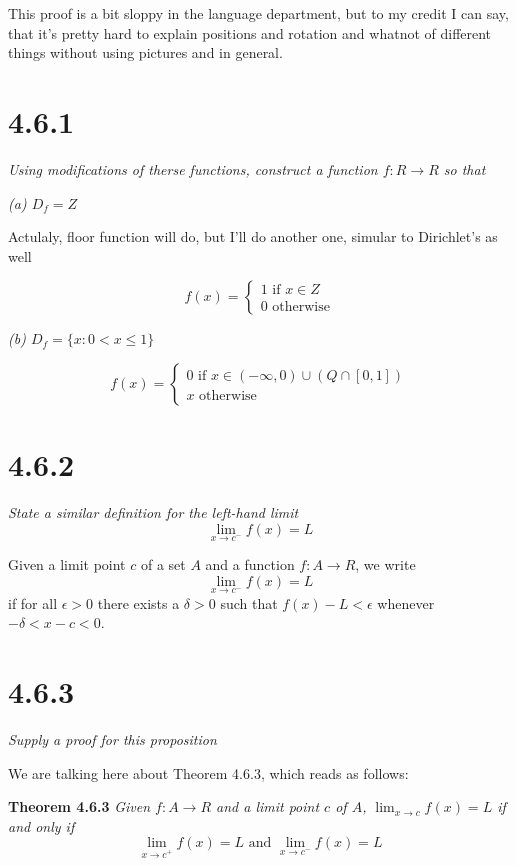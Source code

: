 \documentclass[11pt,oneside,titlepage]{book}
\begin{document}
This proof is a bit sloppy in the language department, but to my credit
I can say, that it's pretty hard to explain positions and rotation and whatnot
of different things without using pictures and in general.


\section*{4.6.1}
\textit{Using modifications of therse functions, construct a function
  $f: R \to R$ so that }

\textit{(a) $D_f = Z$}

Actulaly, floor function will do, but I'll do another one, simular to
Dirichlet's as well

\begin{equation}
  f(x) =
  \begin{cases}
    1 \text{ if } x \in Z \\
    0 \text{ otherwise}
  \end{cases}
\end{equation}

\textit{(b) $D_f = \{x: 0 < x \leq 1\}$}

\begin{equation}
  f(x) =
  \begin{cases}
    0 \text{ if } x \in (-\infty, 0) \cup (Q \cap [0, 1]) \\
    x \text { otherwise}
  \end{cases}
\end{equation}

\section*{4.6.2}
\textit{State a similar definition for the left-hand limit}
$$ \lim_{x \to c^-}{f(x)} = L$$

Given a limit point $c$ of a set $A$ and a function $f: A \to R$, we
write
$$ \lim_{x \to c^-}{f(x)} = L$$
if for all $\epsilon > 0$ there exists a $\delta > 0$ such that
$f(x) - L < \epsilon$ whenever $- \delta   < x - c < 0$.

\section*{4.6.3}
\textit{Supply a proof for this proposition}

We are talking here about Theorem 4.6.3, which reads as follows:

\textbf{Theorem 4.6.3}
\textit{Given $f: A \to R$ and a limit point $c$ of $A$,
  $\lim_{x \to c}{f(x)} = L$ if and only if }
$$ \lim_{x \to c^+}{f(x)} = L \text{ and } \lim_{x \to c^-}{f(x)} = L$$
\end{document}
